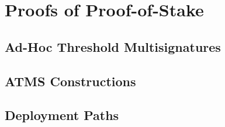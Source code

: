\chapter{Proofs of Proof-of-Stake}\label{chapter:stake}

\cite{pos-sidechains}

\section{Ad-Hoc Threshold Multisignatures}
\section{ATMS Constructions}
\section{Deployment Paths}
